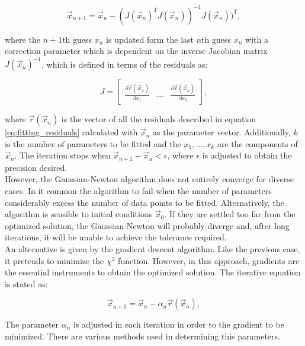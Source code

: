\documentclass[openany]{book}
\begin{document}
\begin{equation}\label{eq:fitting_GaussianNewton}
	\vec x_{n+1} = \vec x_{n}  - (J(\vec x_n)^{T} J(\vec x_n))^{-1} J(\vec x_n))^{T},
\end{equation}

where the $n+1$th guess $x_n$ is updated form the last $n$th guess $x_n$ with a correction parameter which is dependent on the inverse Jacobian matrix $J(\vec x_n)^{-1}$, which is defined in terms of the residuals as:

\begin{equation}\label{eq:fitting_Jacobian}
	J  = \left[ \begin{array}{ccc}
		\frac{\partial \vec r(\vec x_n) }{\partial x_1  } & ... &  	\frac{\partial  \vec r(\vec x_n) }{\partial x_k}
	\end{array} \right], 
\end{equation}

where $\vec r(\vec x_n) $ is the vector of all the residuals described in equation \ref{eq:fitting_residuals} calculated with $\vec x_n$ as the parameter vector. Additionally,  $k$ is the number of parameters to be fitted and the $x_1,..., x_k$ are the components of $\vec x_n$.  The iteration stops when $\vec x_{n+1}   - \vec x_n < \epsilon$, where $\epsilon$ is adjusted to obtain the precision desired. \\

However,  the Gaussian-Newton algorithm does not entirely converge for diverse cases. In it common the algorithm to fail when the number of parameters  considerably excess the number of data points to be fitted. Alternatively, the algorithm is sensible to initial conditions $\vec x_0$. If they are settled too far from the optimized solution, the Gaussian-Newton will probably diverge and, after long iterations, it will be unable to achieve the tolerance required.  \\

An alternative is given by the gradient descent algorithm. Like the previous case, it pretends to minimize the $\chi^2$ function. However, in this approach, gradients are the essential instruments to obtain the optimized solution.  The iterative equation is stated as: 

\begin{equation}\label{eq:fitting_gradientDescent}
	\vec x_{n+1} = \vec x_{n} - \alpha_n \vec r(\vec x_n),
\end{equation}

The parameter $\alpha_n$ is adjusted in each iteration in order to the gradient to be minimized. There are various methods used in determining this parameters. \\
\end{document}
